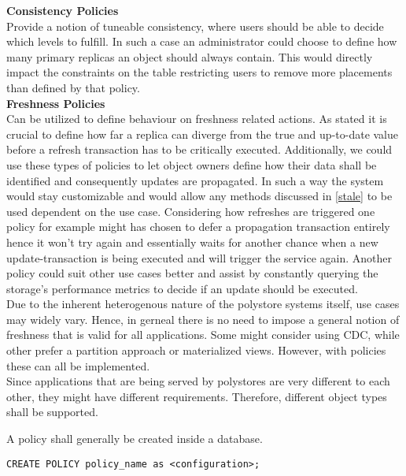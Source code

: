 \textbf{Consistency Policies}\\
Provide a notion of tuneable consistency, where users should be able to decide which levels to fulfill.
In such a case an administrator could choose to define how many primary replicas an object should always contain.
This would directly impact the constraints on the table restricting users to remove more placements than defined by that policy.\\


\textbf{Freshness Policies}\\
Can be utilized to define behaviour on freshness related actions. As \cite{fekete:2018} stated it is crucial to define how far a replica can diverge from the true
and up-to-date value before a refresh transaction has to be critically executed.
Additionally, we could use these types of policies to let object owners define how their data shall be identified and consequently updates are propagated.
In such a way the system would stay customizable and would allow any methods discussed in \ref{stale} to be used dependent on the use case.
Considering how refreshes are triggered one policy for example might has chosen to defer a propagation transaction entirely hence it won't try again and
essentially waits for another chance when a new update-transaction is being executed and will trigger the service again. Another policy could suit other use cases better 
and assist by constantly querying the storage's performance metrics to decide if an update should be executed.\\

Due to the inherent heterogenous nature of the polystore systems itself, use cases may widely vary. Hence, in gerneal there is no need to impose a 
general notion of freshness that is valid for all applications. Some might consider using CDC, while other prefer a partition approach or materialized views.
However, with policies these can all be implemented.\\



Since applications that are being served by polystores are very different to each other, they might have different requirements. 
Therefore, different object types shall be supported.

A policy shall generally be created inside a database.
\begin{verbatim}
CREATE POLICY policy_name as <configuration>;
\end{verbatim}

